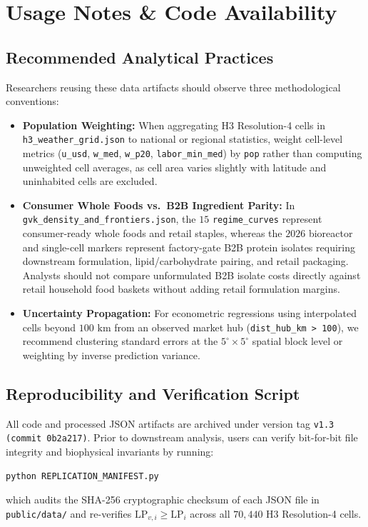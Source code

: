 \documentclass[11pt,a4paper]{article}
\begin{document}
\section{Usage Notes \& Code Availability}

\subsection{Recommended Analytical Practices}
Researchers reusing these data artifacts should observe three methodological conventions:
\begin{itemize}
    \item \textbf{Population Weighting:} When aggregating H3 Resolution-4 cells in \texttt{h3\_weather\_grid.json} to national or regional statistics, weight cell-level metrics (\texttt{u\_usd}, \texttt{w\_med}, \texttt{w\_p20}, \texttt{labor\_min\_med}) by \texttt{pop} rather than computing unweighted cell averages, as cell area varies slightly with latitude and uninhabited cells are excluded.
    \item \textbf{Consumer Whole Foods vs.\ B2B Ingredient Parity:} In \texttt{gvk\_density\_and\_frontiers.json}, the $15$ \texttt{regime\_curves} represent consumer-ready whole foods and retail staples, whereas the $2026$ bioreactor and single-cell markers represent factory-gate B2B protein isolates requiring downstream formulation, lipid/carbohydrate pairing, and retail packaging. Analysts should not compare unformulated B2B isolate costs directly against retail household food baskets without adding retail formulation margins.
    \item \textbf{Uncertainty Propagation:} For econometric regressions using interpolated cells beyond $100\text{ km}$ from an observed market hub (\texttt{dist\_hub\_km > 100}), we recommend clustering standard errors at the $5^\circ \times 5^\circ$ spatial block level or weighting by inverse prediction variance.
\end{itemize}

\subsection{Reproducibility and Verification Script}
All code and processed JSON artifacts are archived under version tag \texttt{v1.3 (commit 0b2a217)}. Prior to downstream analysis, users can verify bit-for-bit file integrity and biophysical invariants by running:
\begin{verbatim}
python REPLICATION_MANIFEST.py
\end{verbatim}
which audits the SHA-256 cryptographic checksum of each JSON file in \texttt{public/data/} and re-verifies $\text{LP}_{v,i} \ge \text{LP}_i$ across all $70{,}440$ H3 Resolution-4 cells.
\end{document}
